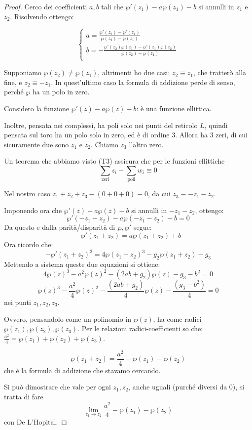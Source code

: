 \begin{proof}
Cerco dei coefficienti $a,b$ tali che $\wp'(z_1) - a\wp(z_1) - b$ si annulli in $z_1$ e $z_2$.
Risolvendo ottengo:

\begin{displaymath}
  \left\{
    \begin{array}{l}
      a = \frac{\wp'(z_2) - \wp'(z_1)}{\wp(z_2) - \wp(z_1)} \\
      b = - \frac{\wp'(z_2) \wp(z_1) - \wp'(z_1) \wp(z_2)}{\wp(z_2) - \wp(z_1)} \\
    \end{array}
  \right.
\end{displaymath}

Supponiamo $\wp(z_2) \neq \wp(z_1)$, altrimenti ho due casi: $z_2 \equiv z_1$, che tratterò alla fine, e $z_2 \equiv -z_1$.
In quest'ultimo caso la formula di addizione perde di senso, perché $\wp$ ha un polo in zero.


Considero la funzione $\wp'(z) - a \wp(z) - b$: è una funzione ellittica.

Inoltre, pensata nei complessi, ha poli solo nei punti del reticolo $L$, quindi pensata sul toro ha un polo solo in zero, ed è di ordine 3.
Allora ha 3 zeri, di cui sicuramente due sono $z_1$ e $z_2$. Chiamo $z_3$ l'altro zero.

Un teorema che abbiamo visto (T3) assicura che per le funzioni ellittiche $$ \sum_\text{zeri} z_i - \sum_\text{poli} w_i \equiv 0$$

Nel nostro caso $z_1 + z_2 + z_3 - (0+0+0) \equiv 0$, da cui $z_3 \equiv - z_1 - z_2$.

Imponendo ora che $\wp'(z) - a \wp(z) - b$ si annulli in $ -z_1 - z_2 $, ottengo:
$$ \wp'(-z_1-z_2) - a \wp(-z_1-z_2) - b = 0 $$
Da questo e dalla parità/disparità di $ \wp, \wp' $ segue:
$$ - \wp'(z_1+z_2) = a \wp(z_1+z_2) + b $$
Ora ricordo che: $$ - \wp'(z_1+z_2)^2 = 4 \wp(z_1+z_2)^3 - g_2 \wp(z_1+z_2) - g_3 $$
Mettendo a sistema queste due equazioni si ottiene:
$$4 \wp(z)^3 -a^2 \wp(z)^2 - (2ab+g_2) \wp(z) - g_3 - b^2=0$$
$$\wp(z)^3 -\frac{a^2}{4} \wp(z)^2 - \frac{(2ab+g_2)}{4} \wp(z) - \frac{(g_3 - b^2)}{4}=0$$
nei punti $z_1, z_2, z_3$.

Ovvero, pensandolo come un polinomio in $\wp(z)$, ha come radici $\wp(z_1), \wp(z_2), \wp(z_3)$.
Per le relazioni radici-coefficienti so che: $\frac{a^2}{4} = \wp(z_1) + \wp(z_2) + \wp(z_3)$.

$$\wp(z_1+z_2) = \frac{a^2}{4} - \wp(z_1) - \wp(z_2)$$
che è la formula di addizione che stavamo cercando.


Si può dimostrare che vale per ogni $z_1, z_2$, anche uguali (purché diversi da $0$), si tratta di fare
$$ \lim_{z_1 \rightarrow z_2} \frac{a^2}{4} - \wp(z_1) - \wp(z_2)$$ con De L'Hopital.
\end{proof}


